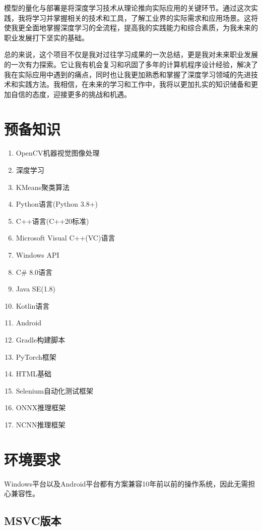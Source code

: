 模型的量化与部署是将深度学习技术从理论推向实际应用的关键环节。通过这次实践，我将学习并掌握相关的技术和工具，了解工业界的实际需求和应用场景。这将使我更全面地掌握深度学习的全流程，提高我的实践能力和综合素质，为我未来的职业发展打下坚实的基础。

总的来说，这个项目不仅是我对过往学习成果的一次总结，更是我对未来职业发展的一次有力探索。它让我有机会复习和巩固了多年的计算机程序设计经验，解决了我在实际应用中遇到的痛点，同时也让我更加熟悉和掌握了深度学习领域的先进技术和实践方法。我相信，在未来的学习和工作中，我将以更加扎实的知识储备和更加自信的态度，迎接更多的挑战和机遇。

\section{预备知识}

\begin{enumerate}
	\item OpenCV机器视觉图像处理
	\item 深度学习
	\item KMeans聚类算法
	\item Python语言(Python 3.8+)
	\item C++语言(C++20标准)
	\item Microsoft Visual C++(VC)语言
	\item Windows API
	\item C\# 8.0语言
	\item Java SE(1.8)
	\item Kotlin语言
	\item Android
	\item Gradle构建脚本
	\item PyTorch框架
	\item HTML基础
	\item Selenium自动化测试框架
	\item ONNX推理框架
	\item NCNN推理框架
\end{enumerate}

\section{环境要求}

Windows平台以及Android平台都有方案兼容10年前以前的操作系统，因此无需担心兼容性。

\subsection{MSVC版本}

